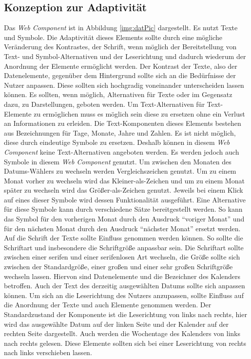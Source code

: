 \documentclass[12pt, paper=a4, bibtotoc, toc=listof, headsepline=true]{scrreprt}
\begin{document}
		\subsection{Konzeption zur Adaptivität}
		Das \emph{Web Component} ist in Abbildung \ref{img:datPic} dargestellt. Es nutzt Texte und Symbole. Die Adaptivität dieses Elements sollte durch eine mögliche Veränderung des Kontrastes, der Schrift, wenn möglich der Bereitstellung von Text- und Symbol-Alternativen und der Leserichtung und dadurch wiederum der Anordnung der Elemente ermöglicht werden.
		\newline
		Der Kontrast der Texte, also der Datenelemente, gegenüber dem Hintergrund sollte sich an die Bedürfnisse der Nutzer anpassen. Diese sollten sich hochgradig voneinander unterscheiden lassen können. 
		Es sollten, wenn möglich, Alternativen für Texte oder im Gegensatz dazu, zu Darstellungen, geboten werden. Um Text-Alternativen für Text-Elemente zu ermöglichen muss es möglich sein diese zu ersetzen ohne ein Verlust an Informationen zu erleiden. Die Text-Komponenten dieses Elements bestehen aus Bezeichnungen für Tage, Monate, Jahre und Zahlen. Es ist nicht möglich, diese durch eindeutige Symbole zu ersetzen. Deshalb können in diesem \emph{Web Component} keine Text-Alternativen angeboten werden. Es werden jedoch auch Symbole in diesem \emph{Web Component} genutzt. Um zwischen den Monaten des Datums-Wählers zu wechseln werden Vergleichszeichen genutzt. Um zu einem Monat vorher zu wechseln wird das Kleiner-als-Zeichen und um zu einem Monat später zu wechseln wird das Größer-als-Zeichen genutzt. Jeweils bei einem Klick auf eines dieser Symbole wird dessen Funktionalität ausgeführt. Eine Alternative für diese Symbole kann durch verschiedene Sätze bereitgestellt werden. So kann das Symbol für den vorherigen Monat durch den Ausdruck \enquote{voriger Monat} und für den nächsten Monat durch den Ausdruck \enquote{nächster Monat} ersetzt werden.
		Auf die Schrift der Texte sollte Einfluss genommen werden können. So sollte die Schriftart und insbesondere die Schriftgröße anpassbar sein. Die Schriftart sollte zwischen einer serifen und einer serifenlosen Art wechseln, die Größe sollte sich zwischen der Standardgröße, einer großen und einer sehr großen Schriftgröße wechseln lassen. Hiervon sind Datenelemente und die Bezeichner des Kalenders betroffen. Auch der Text des derzeitig ausgewählten Datums sollte sich anpassen können.
		Um sich an die Leserichtung des Nutzers anzupassen, sollte Einfluss auf die Anordnung der Texte und auch Elemente genommen werden. Der Standardzustand der Komponente ist die Leserichtung von links nach rechts, hier wird das ausgewählte Datum auf der linken Seite und der Kalender auf der rechten Seite dargestellt. Auch werden die Wochentage des Kalenders von links nach rechts gelesen. Diese Elemente sollten sich bei einer Leserichtung von rechts nach links verschieben lassen.  
\end{document}
